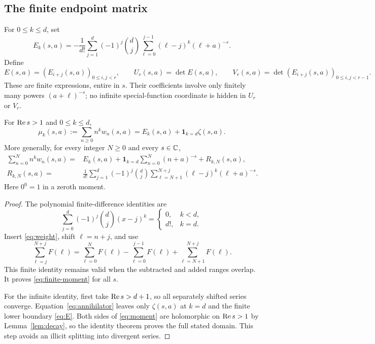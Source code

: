 \subsection{The finite endpoint matrix}
For $0\le k\le d$, set
\begin{equation}\label{eq:E}
 E_k(s,a)=-\frac1{d!}\sum_{j=1}^{d}(-1)^j\binom dj
       \sum_{\ell=0}^{j-1}(\ell-j)^k(\ell+a)^{-s}.
\end{equation}
Define
\begin{equation}\label{eq:UV}
 E(s,a)=(E_{i+j}(s,a))_{0\le i,j<r},\qquad
 U_r(s,a)=\det E(s,a),\qquad
 V_r(s,a)=\det(E_{i+j}(s,a))_{0\le i,j<r-1}.
\end{equation}
These are finite expressions, entire in $s$. Their coefficients involve
only finitely many powers $(a+\ell)^{-s}$; no infinite special-function
coordinate is hidden in $U_r$ or $V_r$.

\begin{lemma}\label{lem:moments}
For $\operatorname{Re} s>1$ and $0\le k\le d$,
\begin{equation}\label{eq:moment}
 \mu_k(s,a):=\sum_{n\ge0}n^k w_n(s,a)
       =E_k(s,a)+\mathbf1_{k=d}\zeta(s,a).
\end{equation}
More generally, for every integer $N\ge0$ and every $s\in\mathbb C$,
\begin{align}
 \sum_{n=0}^Nn^k w_n(s,a)
 ={}&E_k(s,a)+\mathbf1_{k=d}\sum_{n=0}^N(n+a)^{-s}
       +R_{k,N}(s,a),\label{eq:finite-moment}\\
 R_{k,N}(s,a)
 ={}&\frac1{d!}\sum_{j=1}^d(-1)^j\binom dj
       \sum_{\ell=N+1}^{N+j}(\ell-j)^k(\ell+a)^{-s}.
       \label{eq:upper-boundary}
\end{align}
Here $0^0=1$ in a zeroth moment.
\end{lemma}
\begin{proof}
The polynomial finite-difference identities are
\begin{equation}\label{eq:annihilator}
 \sum_{j=0}^d(-1)^j\binom dj(x-j)^k
 =\begin{cases}0,&k<d,\\ d!,&k=d.\end{cases}
\end{equation}
Insert \eqref{eq:weight}, shift $\ell=n+j$, and use
\[
 \sum_{\ell=j}^{N+j}F(\ell)
 =\sum_{\ell=0}^{N}F(\ell)
  -\sum_{\ell=0}^{j-1}F(\ell)
  +\sum_{\ell=N+1}^{N+j}F(\ell).
\]
This finite identity remains valid when the subtracted and added ranges
overlap. It proves \eqref{eq:finite-moment} for all $s$.

For the infinite identity, first take $\operatorname{Re} s>d+1$, so all separately
shifted series converge. Equation~\eqref{eq:annihilator} leaves only
$\zeta(s,a)$ at $k=d$ and the finite lower boundary \eqref{eq:E}.
Both sides of \eqref{eq:moment} are holomorphic on $\operatorname{Re} s>1$ by
Lemma~\ref{lem:decay}, so the identity theorem proves the full stated
domain. This step avoids an illicit splitting into divergent series.
\end{proof}


